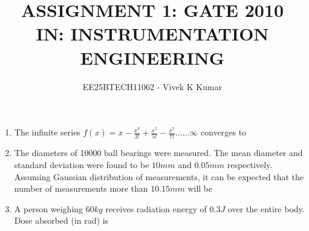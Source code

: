 \documentclass[journal,12pt,onecolumn]{IEEEtran}
\theoremstyle{remark}
\begin{document}
\title{
ASSIGNMENT 1: GATE 2010 \\
IN: INSTRUMENTATION ENGINEERING}
\author{EE25BTECH11062 - Vivek K Kumar}
\maketitle
\renewcommand{\thefigure}{\theenumi}
\renewcommand{\thetable}{\theenumi}
\begin{enumerate}

\item The infinite series $f(x) = x - \frac{x^3}{3!} + \frac{x^5}{5!} - \frac{x^7}{7!} \dots \dots \infty$ converges to

\hfill{}
\begin{enumerate}
\end{enumerate}

\item The diameters of 10000 ball bearings were measured. The mean diameter and standard deviation were found to be $10mm$ and $0.05mm$ respectively. Assuming Gaussian distribution of measurements, it can be expected that the number of measurements more than $ 10.15 mm$ will be

\hfill{}
\begin{enumerate}
\end{enumerate}

\item A person weighing $60kg$ receives radiation energy of $0.3J$ over the entire body. Dose absorbed (in rad) is

\hfill{}
\begin{enumerate}
\end{enumerate}


\end{enumerate}
\end{document}
